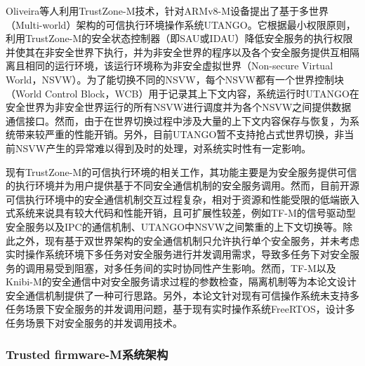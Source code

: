 \documentclass[12pt,a4paper]{ctexart}
\numberwithin{figure}{section}
\begin{document}
\par Oliveira\cite{uTango}等人利用TrustZone-M技术，针对ARMv8-M设备提出了基于多世界（Multi-world）架构的可信执行环境操作系统UTANGO。它根据最小权限原则，利用TrustZone-M的安全状态控制器（即SAU或IDAU）降低安全服务的执行权限并使其在非安全世界下执行，并为非安全世界的程序以及各个安全服务提供互相隔离且相同的运行环境，该运行环境称为非安全虚拟世界（Non-secure Virtual World，NSVW）。为了能切换不同的NSVW，每个NSVW都有一个世界控制块（World Control Block，WCB）用于记录其上下文内容，系统运行时UTANGO在安全世界为非安全世界运行的所有NSVW进行调度并为各个NSVW之间提供数据通信接口。然而，由于在世界切换过程中涉及大量的上下文内容保存与恢复，为系统带来较严重的性能开销。另外，目前UTANGO暂不支持抢占式世界切换，非当前NSVW产生的异常难以得到及时的处理，对系统实时性有一定影响。
\par 现有TrustZone-M的可信执行环境的相关工作，其功能主要是为安全服务提供可信的执行环境并为用户提供基于不同安全通信机制的安全服务调用。然而，目前开源可信执行环境中的安全通信机制交互过程复杂，相对于资源和性能受限的低端嵌入式系统来说具有较大代码和性能开销，且可扩展性较差，例如TF-M的信号驱动型安全服务以及IPC的通信机制、UTANGO中NSVW之间繁重的上下文切换等。除此之外，现有基于双世界架构的安全通信机制只允许执行单个安全服务，并未考虑实时操作系统环境下多任务对安全服务进行并发调用需求，导致多任务下对安全服务的调用易受到阻塞，对多任务间的实时协同性产生影响。然而，TF-M以及Knibi-M的安全通信中对安全服务请求过程的参数检查，隔离机制等为本论文设计安全通信机制提供了一种可行思路。另外，本论文针对现有可信操作系统未支持多任务场景下安全服务的并发调用问题，基于现有实时操作系统FreeRTOS，设计多任务场景下对安全服务的并发调用技术。


\subsubsection{Trusted firmware-M系统架构}
\end{document}

